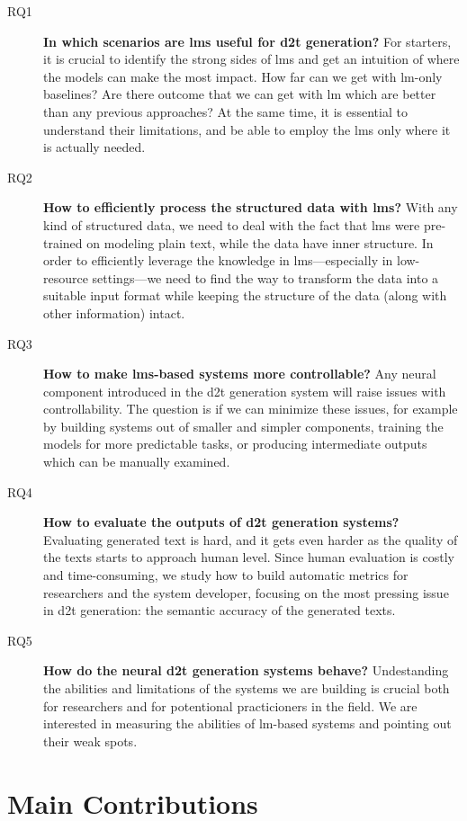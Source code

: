 \begin{description}
    \item[RQ1] \textbf{In which scenarios are \acp{lm} useful for \ac{d2t} generation?} For starters, it is crucial to identify the strong sides of \acp{lm} and get an intuition of where the models can make the most impact. How far can we get with \ac{lm}-only baselines? Are there outcome that we can get with \ac{lm} which are better than any previous approaches? At the same time, it is essential to understand their limitations, and be able to employ the \acp{lm} only where it is actually needed.
    \item[RQ2] \textbf{How to efficiently process the structured data with \acp{lm}?} With any kind of structured data, we need to deal with the fact that \acp{lm} were pre-trained on modeling plain text, while the data have inner structure. In order to efficiently leverage the knowledge in \acp{lm}---especially in low-resource settings---we need to find the way to transform the data into a suitable input format while keeping the structure of the data (along with other information) intact.
    \item[RQ3] \textbf{How to make \acp{lm}-based systems more controllable?} Any neural component introduced in the \ac{d2t} generation system will raise issues with controllability. The question is if we can minimize these issues, for example by building systems out of smaller and simpler components, training the models for more predictable tasks, or producing intermediate outputs which can be manually examined.
    \item[RQ4] \textbf{How to evaluate the outputs of \ac{d2t} generation systems?} Evaluating generated text is hard, and it gets even harder as the quality of the texts starts to approach human level. Since human evaluation is costly and time-consuming, we study how to build automatic metrics for researchers and the system developer, focusing on the most pressing issue in \ac{d2t} generation: the semantic accuracy of the generated texts.
    \item[RQ5] \textbf{How do the neural \ac{d2t} generation systems behave?} Undestanding the abilities and limitations of the systems we are building is crucial both for researchers and for potentional practicioners in the field. We are interested in measuring the abilities of \ac{lm}-based systems and pointing out their weak spots.
\end{description}



\section{Main Contributions}
\label{sec:contributions}


